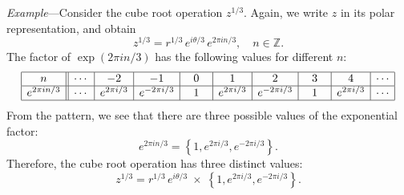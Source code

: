 \documentclass[10pt,a4paper]{article}
\begin{document}
\begin{framed} \noindent
  \textit{Example}---Consider the cube root operation
  $z^{1/3}$. Again, we write $z$ in its polar representation, and
  obtain
\begin{equation}
z^{1/3} = r^{1/3} \, e^{i\theta/3} \, e^{2\pi i n/3}, \quad n \in \mathbb{Z}.
\end{equation}
The factor of $\exp(2\pi i n/3)$ has the following values for
different $n$:
\begin{equation*}
\begin{array}{|c||c|c|c|c|c|c|c|c|c|} \hline n &\cdots & -2 & -1 & 0 & 1 & 2 & 3 & 4 & \cdots \\ \hline e^{2\pi i n/3} &\cdots & e^{2\pi i /3} & e^{-2\pi i /3} & \;\,\;1\;\,\; & e^{2\pi i /3} & e^{-2\pi i /3} & \;\,\;1\;\,\; & e^{2\pi i /3} & \cdots \\ \hline \end{array}
\end{equation*}
From the pattern, we see that there are three possible values of the
exponential factor:
\begin{equation}
e^{2\pi i n/3} = \left\{1, e^{2\pi i /3}, e^{-2\pi i /3}\right\}.
\end{equation}
Therefore, the cube root operation has three distinct values:
\begin{equation}
z^{1/3} = r^{1/3} \, e^{i\theta/3} \;\times\; \left\{1, e^{2\pi i /3}, e^{-2\pi i /3}\right\}.
\end{equation}
\end{framed}

\end{document}

